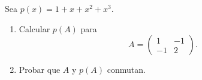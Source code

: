 \item Sea $p(x)=1+x+x^2+x^3$.
    \begin{enumerate}
        \item Calcular $p(A)$ para \[A=\begin{pmatrix}
                1&-1\\-1&2
            \end{pmatrix}.\]
            \begin{mdframed}[style=s]
                
            \end{mdframed}
        \item Probar que $A$ y $p(A)$ conmutan.
            \begin{mdframed}[style=s]
                
            \end{mdframed}
    \end{enumerate}